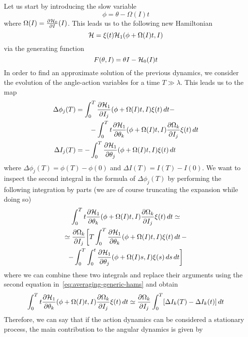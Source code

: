 Let us start by introducing the slow variable
\begin{equation}
	\phi = \theta - \Omega(I)t
\end{equation}
where \(\Omega(I) = \frac{\partial \mathcal{H}_0}{\partial I}(I)\). This leads us to the following new Hamiltonian
\begin{equation}
	\mathcal{H} = \xi(t)\mathcal{H}_1(\phi+\Omega(I)t,I)
\end{equation}
via the generating function
\begin{equation}
	F(\theta,I) = \theta I - \mathcal{H}_0(I)t
\end{equation}
In order to find an approximate solution of the previous dynamics, we consider the evolution of the angle-action variables for a time \(T\gg \lambda\). This leads us to the map
\begin{equation}
	\begin{aligned}
		\Delta\phi_j(T) &= \int_0^T\pdv{\mathcal{H}_1}{I_j}\/(\phi+\Omega(I)t, I)\xi(t)\,dt -\\
		&\qquad - \int_0^T t\pdv{\mathcal{H}_1}{\theta_k}\/(\phi + \Omega(I)t,I)\pdv{\Omega_k}{I_j}\xi(t)\,dt\\
		\Delta I_j(T) &= -\int_0^T\pdv{\mathcal{H}_1}{\theta_j}\/(\phi+\Omega(I)t,I)\xi(t)\,dt
	\end{aligned}
	\label{eq:averaging-generic-hams}
\end{equation}
where \(\Delta \phi_j(T)=\phi(T)-\phi(0)\) and \(\Delta I(T)=I(T)-I(0)\). We want to inspect the second integral in the formula of \(\Delta\phi_j(T)\) by performing the following integration by parts (we are of course truncating the expansion while doing so)
\begin{multline}
	\int_0^T t\pdv{\mathcal{H}_1}{\theta_k}\/(\phi+\Omega(I)t,I)\pdv{\Omega_k}{I_j}\xi(t)\,dt \simeq \\
	\simeq \pdv{\Omega_k}{I_j}\/\bigg[T\int_0^T\pdv{\mathcal{H}_1}{\theta_k}\/(\phi+\Omega(I)t,I)\xi(t)\,dt\, - \\
	- \int_0^T\int_0^t\pdv{\mathcal{H}_1}{\theta_j}\/(\phi+\Omega(I)s, I)\xi(s)\,ds\,dt\bigg]
\end{multline}
where we can combine these two integrals and replace their arguments using the second equation in~\eqref{eq:averaging-generic-hams} and obtain
\begin{equation}
	\int_0^T t\pdv{\mathcal{H}_1}{\theta_k}\/(\phi+\Omega(I)t,I)\pdv{\Omega_k}{I_j}\xi(t)\,dt \simeq \pdv{\Omega_k}{I_j}\int_0^T[\Delta I_k(T)-\Delta I_k(t)]\,dt
\end{equation}
Therefore, we can say that if the action dynamics can be considered a stationary process, the main contribution to the angular dynamics is given by
